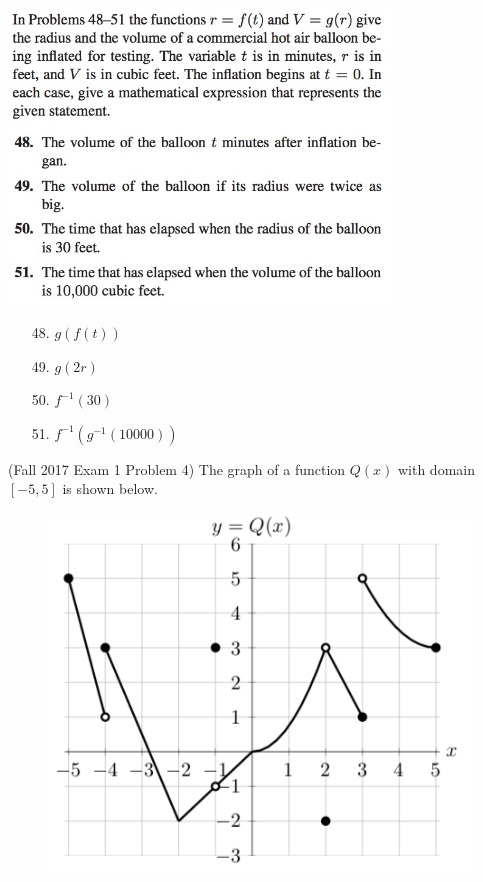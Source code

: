 \documentclass[11pt]{exam}
\begin{document}
\begin{questions}
\begin{parts}
	\includegraphics[width=4in]{no48.jpg}
        \begin{solution}
          \begin{enumerate}
          \item[48.] \(g(f(t))\)
          \item[49.] \(g(2r)\)
          \item[50.] \(f^{-1}(30)\)
          \item[51.] \(f^{-1}(g^{-1}(10000))\)
          \end{enumerate}
        \end{solution}
	\end{parts}
  \question (Fall 2017 Exam 1 Problem 4) The graph of a function
  $Q(x)$ with domain $[-5, 5]$ is shown below.
  \begin{figure}[h]
    \includegraphics[scale=0.35]{Figures/Graphg}
  \end{figure}
  \begin{parts}

\end{parts}
\end{questions}
\end{document}
